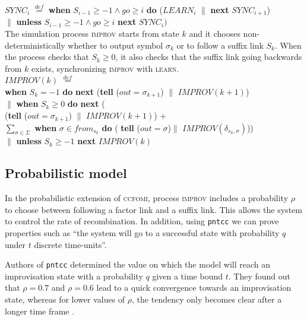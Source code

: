 \documentclass[english]{llncs}
\begin{document}
$SYNC_{i}$ $\overset{def}{=}$  \textbf{when} $S_{i-1} \geq -1 \wedge go \geq i$ \textbf{do} ($LEARN_{i}$ $\|$ \textbf{next} $SYNC_{i+1}$) \\
\hspace*{60pt}$\|$ \textbf{unless} $S_{i-1} \geq -1 \wedge go \geq i$ \textbf{next} $SYNC_{i})$ \\

The simulation process \textsc{improv} starts from state $k$ and it chooses non-deterministically
whether to output symbol $\sigma_{k}$ or to follow a suffix link $S_{k}$. When the process checks that $S_k \geq 0$, it also checks that the suffix link going backwards from $k$ exists, synchronizing \textsc{improv} with \textsc{learn}.\\

$IMPROV(k)$ $\overset{def}{=}$  \\
\hspace*{28pt} \textbf{when} $S_{k}=-1$ \textbf{do} \textbf{next} (\textbf{tell} ($out = \sigma_{k+1}$) $\|$ $IMPROV(k+1)$)  \\
\hspace*{24pt}$\|$ \textbf{when} $S_{k} \geq 0$ \textbf{do}  \textbf{next} (\\
\hspace*{40pt} (\textbf{tell} ($out = \sigma_{k+1}$)  
$\|$ $IMPROV(k+1)$)  +\\
\hspace*{42pt}$\sum _{\sigma \in \Sigma}$ \textbf{when}
$\sigma \in from_{s_{k}}$ \textbf{do} ( \textbf{tell} ($out = \sigma$)$\|$ $IMPROV(\delta_{s_{k},\sigma })$))\\
\hspace*{23pt}$\|$ \textbf{unless} $S_{k} \geq -1$  \textbf{next} $IMPROV(k)$ 

\subsection{Probabilistic model}
In the probabilistic extension of \textsc{ccfomi}, process \textsc{improv} includes a probability \textbf{$\rho$} to choose between following a factor link and a suffix link. This allows the system to control the rate of recombination.
In addition, using \texttt{pntcc} we can prove properties such as ``the system will go to a successful state with probability $q$ under $t$ discrete time-units''.
 
Authors of \texttt{pntcc} determined the value on which the model will reach an improvisation state with a
probability $q$ given 
a time bound $t$. They found out that $\rho = 0.7$ and $\rho = 0.6$ lead to a quick convergence towards an
improvisation state, whereas for lower values of $\rho$, the tendency only becomes clear after a longer time frame \cite{perez09}.
\end{document}
